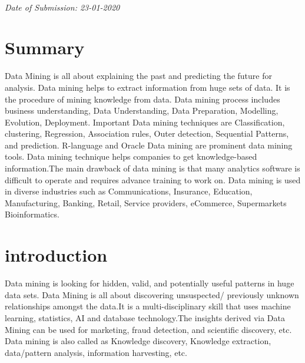 \documentclass[a4paper,10pt]{article}
\begin{document}
\begin{titlepage}
\begin{minipage}{0.5\textwidth}
\begin{flushright}
		\end{flushright}
        
	\end{minipage}\\[2 cm]
	
	
    \emph{\LARGE Date of Submission: 23-01-2020}\\
    
    
    
	
\end{titlepage}

    \section*{Summary}
 Data Mining is all about explaining the past and predicting the future for analysis. Data mining helps to extract information from huge sets of data. It is the procedure of mining knowledge from data. Data mining process includes business understanding, Data Understanding, Data Preparation, Modelling, Evolution, Deployment. Important Data mining techniques are Classification, clustering, Regression, Association rules, Outer detection, Sequential Patterns, and prediction. R-language and Oracle Data mining are prominent data mining tools. Data mining technique helps companies to get knowledge-based information.The main drawback of data mining is that many analytics software is difficult to operate and requires advance training to work on. Data mining is used in diverse industries such as Communications, Insurance, Education, Manufacturing, Banking, Retail, Service providers, eCommerce, Supermarkets Bioinformatics.
    \cleardoublepage

    \tableofcontents
    \thispagestyle{empty}
    \cleardoublepage

    \setcounter{page}{1}

\section{introduction}\label{sec:intro}
Data mining is looking for hidden, valid, and potentially useful patterns in huge data sets. Data Mining is all about discovering
unsuspected/ previously unknown relationships amongst the data.It is a multi-disciplinary skill that uses machine learning, statistics, AI and database technology.The insights derived via Data Mining can be used for marketing, fraud detection, and scientific discovery, etc.
Data mining is also called as Knowledge discovery, Knowledge extraction, data/pattern analysis, information harvesting, etc.
\end{document}
